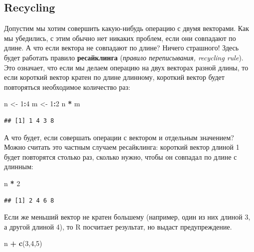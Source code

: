 \documentclass[]{book}
\newenvironment{Shaded}{\begin{snugshade}}{\end{snugshade}}
\newcommand{\KeywordTok}[1]{\textcolor[rgb]{0.13,0.29,0.53}{\textbf{#1}}}
\newcommand{\DecValTok}[1]{\textcolor[rgb]{0.00,0.00,0.81}{#1}}
\newcommand{\StringTok}[1]{\textcolor[rgb]{0.31,0.60,0.02}{#1}}
\newcommand{\OperatorTok}[1]{\textcolor[rgb]{0.81,0.36,0.00}{\textbf{#1}}}
\newcommand{\NormalTok}[1]{#1}
\begin{document}
\subsection{Recycling}\label{recycling}

Допустим мы хотим совершить какую-нибудь операцию с двумя векторами. Как
мы убедились, с этим обычно нет никаких проблем, если они совпадают по
длине. А что если вектора не совпадают по длине? Ничего страшного! Здесь
будет работать правило \textbf{ресайклинга} (\emph{правило
переписывания, recycling rule}). Это означает, что если мы делаем
операцию на двух векторах разной длины, то если короткий вектор кратен
по длине длинному, короткий вектор будет повторяться необходимое
количество раз:

\begin{Shaded}
\begin{Highlighting}[]
\NormalTok{n <-}\StringTok{ }\DecValTok{1}\OperatorTok{:}\DecValTok{4}
\NormalTok{m <-}\StringTok{ }\DecValTok{1}\OperatorTok{:}\DecValTok{2}
\NormalTok{n }\OperatorTok{*}\StringTok{ }\NormalTok{m}
\end{Highlighting}
\end{Shaded}

\begin{verbatim}
## [1] 1 4 3 8
\end{verbatim}

А что будет, если совершать операции с вектором и отдельным значением?
Можно считать это частным случаем ресайклинга: короткий вектор длиной 1
будет повторятся столько раз, сколько нужно, чтобы он совпадал по длине
с длинным:

\begin{Shaded}
\begin{Highlighting}[]
\NormalTok{n }\OperatorTok{*}\StringTok{ }\DecValTok{2}
\end{Highlighting}
\end{Shaded}

\begin{verbatim}
## [1] 2 4 6 8
\end{verbatim}

Если же меньший вектор не кратен большему (например, один из них длиной
3, а другой длиной 4), то R посчитает результат, но выдаст
предупреждение.

\begin{Shaded}
\begin{Highlighting}[]
\NormalTok{n }\OperatorTok{+}\StringTok{ }\KeywordTok{c}\NormalTok{(}\DecValTok{3}\NormalTok{,}\DecValTok{4}\NormalTok{,}\DecValTok{5}\NormalTok{)}
\end{Highlighting}
\end{Shaded}
\end{document}
